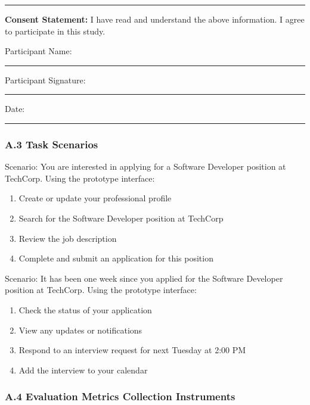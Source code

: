 \documentclass[
	letterpaper, %
]{jdf}
\begin{document}
\begin{sloppypar}
\vspace{0.5cm}
\rule{8cm}{0.5pt}

\textbf{Consent Statement:} I have read and understand the above information. I agree to participate in this study.

\vspace{0.5cm}
Participant Name: \rule{8cm}{0.5pt}

Participant Signature: \rule{8cm}{0.5pt}

Date: \rule{4cm}{0.5pt}

\subsubsection{A.3 Task Scenarios}


Scenario: You are interested in applying for a Software Developer position at TechCorp. Using the prototype interface:

\begin{enumerate}
    \item Create or update your professional profile
    \item Search for the Software Developer position at TechCorp
    \item Review the job description
    \item Complete and submit an application for this position
\end{enumerate}


Scenario: It has been one week since you applied for the Software Developer position at TechCorp. Using the prototype interface:

\begin{enumerate}
    \item Check the status of your application
    \item View any updates or notifications
    \item Respond to an interview request for next Tuesday at 2:00 PM
    \item Add the interview to your calendar
\end{enumerate}

\subsubsection{A.4 Evaluation Metrics Collection Instruments}


\end{sloppypar}
\end{document}
